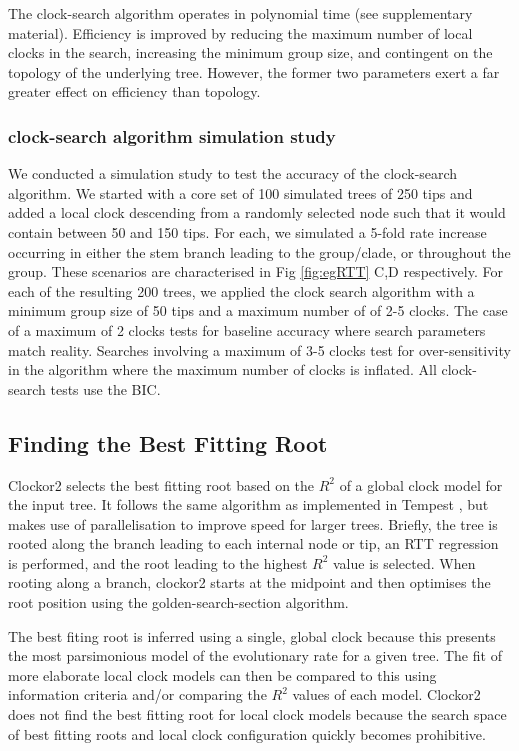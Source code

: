 \documentclass{article}
\begin{document}
The clock-search algorithm operates in polynomial time (see supplementary material). Efficiency is improved by reducing the maximum number of local clocks in the search, increasing the minimum group size, and contingent on the topology of the underlying tree. However, the former two parameters exert a far greater effect on efficiency than topology.

\subsubsection*{clock-search algorithm simulation study}
We conducted a simulation study to test the accuracy of the clock-search algorithm. We started with a core set of 100 simulated trees of 250 tips and added a local clock descending from a randomly selected node such that it would contain between 50 and 150 tips. For each, we simulated a 5-fold rate increase occurring in either the stem branch leading to the group/clade, or throughout the group. These scenarios are characterised in  Fig \ref{fig:egRTT} C,D respectively. For each of the resulting 200 trees, we applied the clock search algorithm with a minimum group size of 50 tips and a maximum number of of 2-5 clocks. The case of a maximum of 2 clocks tests for baseline accuracy where search parameters match reality. Searches involving a maximum of 3-5 clocks test for over-sensitivity in the algorithm where the maximum number of clocks is inflated. All clock-search tests use the BIC.


\subsection*{Finding the Best Fitting Root}
Clockor2 selects the best fitting root based on the $R^2$ of a global clock model for the input tree. It follows the same algorithm as implemented in Tempest \citet{rambaut_exploring_2016}, but makes use of parallelisation to improve speed for larger trees. Briefly, the tree is rooted along the branch leading to each internal node or tip, an RTT regression is performed, and the root leading to the highest $R^2$ value is selected. When rooting along a branch, clockor2 starts at the midpoint and then optimises the root position using the golden-search-section algorithm.

The best fiting root is inferred using a single, global clock because this presents the most parsimonious model of the evolutionary rate for a given tree. The fit of more elaborate local clock models can then be compared to this using information criteria and/or comparing the $R^2$ values of each model. Clockor2 does not find the best fitting root for local clock models because the search space of best fitting roots and local clock configuration quickly becomes prohibitive.
\end{document}
